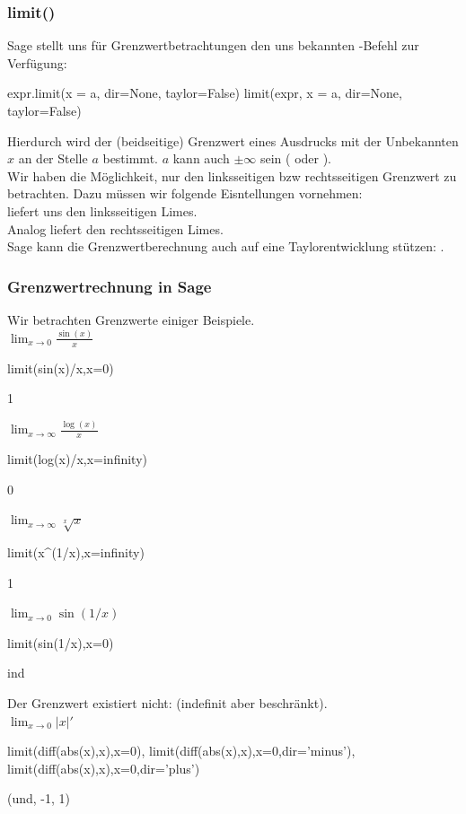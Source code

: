 \documentclass[fontsize=12pt,paper=a4,twoside,bibtotoc,idxtotoc,
liststotoc,pagesize,BCOR1.2cm,DIV15,chapterprefix,pagesize=pdftex]{scrbook}
\theoremstyle{plain}
\theoremstyle{definition}
\theoremstyle{remark}
\begin{document}
\subsubsection{limit()}
Sage stellt uns für Grenzwertbetrachtungen den uns bekannten -Befehl zur Verfügung:
\begin{sagein}
expr.limit(x = a, dir=None, taylor=False)
limit(expr, x = a, dir=None, taylor=False)
\end{sagein}
Hierdurch wird der (beidseitige) Grenzwert eines Ausdrucks mit der Unbekannten $x$ an
der Stelle $a$ bestimmt. $a$ kann auch $\pm \infty$ sein ( oder ).\\
Wir haben die Möglichkeit, nur den linksseitigen bzw rechtsseitigen Grenzwert zu betrachten. Dazu müssen wir folgende Eisntellungen vornehmen:\\
 liefert uns den linksseitigen Limes.\\ 
Analog liefert  den rechtsseitigen Limes.\\
Sage kann die Grenzwertberechnung auch auf eine Taylorentwicklung stützen: . 
\subsubsection{Grenzwertrechnung in Sage}
Wir betrachten Grenzwerte einiger Beispiele.\\
$\lim_{x \rightarrow 0}
\frac{\sin(x)}{x}$
\begin{sagein}
limit(sin(x)/x,x=0)
\end{sagein}
\begin{sage}
  1
\end{sage}
$\lim_{x \rightarrow \infty}
\frac{\log(x)}{x}$
\begin{sagein}
limit(log(x)/x,x=infinity)
\end{sagein}
\begin{sage}
  0
\end{sage}
$\lim_{x \rightarrow \infty} \sqrt[x]{x}$
\begin{sagein}
limit(x^(1/x),x=infinity)
\end{sagein}
\begin{sage}
  1
\end{sage}
$\lim_{x \rightarrow 0}
\sin(1/x)$
\begin{sagein}
limit(sin(1/x),x=0)
\end{sagein}
\begin{sage}
  ind
\end{sage}
Der Grenzwert existiert nicht:  (indefinit aber beschränkt).\\ 
$\lim_{x \rightarrow 0} |x|' $
\begin{sagein}
limit(diff(abs(x),x),x=0),
limit(diff(abs(x),x),x=0,dir='minus'),
limit(diff(abs(x),x),x=0,dir='plus')
\end{sagein}
\begin{sage}
  (und, -1, 1)
\end{sage}
\end{document}
